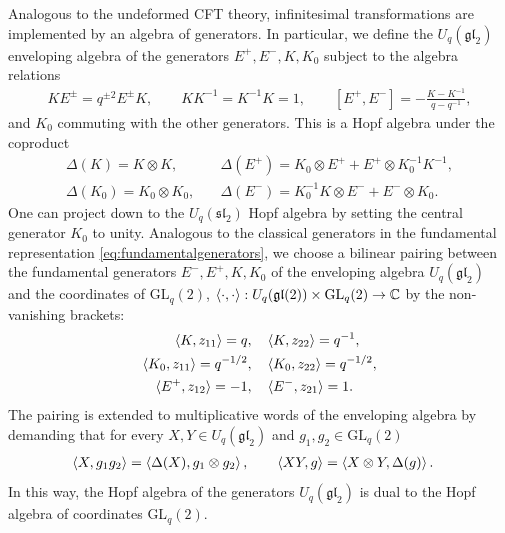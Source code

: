 \documentclass[a4paper,titlepage,12pt]{article}
\numberwithin{equation}{section}
\begin{document}
Analogous to the undeformed CFT theory, infinitesimal transformations are implemented by an algebra of generators. In particular, we define the $U_q(\mathfrak{gl}_2)$ enveloping algebra of the generators $E^+,E^-,K,K_0$ subject to the algebra relations \begin{align}\label{eq:generatoralgebra}
    KE^\pm=q^{\pm 2}E^\pm K, \qquad KK^{-1}=K^{-1}K=1, \qquad [E^+,E^-]=-\frac{K-K^{-1}}{q-q^{-1}},
\end{align} and $K_0$ commuting with the other generators. This is a Hopf algebra under the coproduct 
\begin{align}
    \Delta(K) = K \otimes K, &\quad \Delta(E^+) = K_0 \otimes E^+ + E^+ \otimes K_0^{-1}K^{-1}, \\
    \Delta(K_0)= K_0 \otimes K_0,& \quad \Delta(E^-) =  K_0^{-1}K \otimes E^- + E^- \otimes K_0.
\end{align}  
One can project down to the $U_q(\mathfrak{sl}_2)$ Hopf algebra by setting the central generator $K_0$ to unity.
 Analogous to the classical generators in the fundamental representation \eqref{eq:fundamentalgenerators}, we choose a bilinear pairing between the fundamental generators $E^-,E^+,K,K_0$ of the enveloping algebra $U_q(\mathfrak{gl}_2)$ and the coordinates of GL$_q(2)$, $\braket{\cdot,\cdot}: U_q(\mathfrak{gl}(2)) \times \text{GL}_q(2) \to \mathbb{C}$ by the non-vanishing brackets:
\begin{align}
\label{eq:pairings}
    \braket{K,z_{11}} = q, &\quad \braket{K,z_{22}} = q^{-1},\\
    \braket{K_0,z_{11}} = q^{-1/2}, &\quad \braket{K_0,z_{22}} = q^{-1/2},\\
    \braket{E^+,z_{12}} = -1, &\quad \braket{E^-,z_{21}} = 1.  
\end{align} 
The pairing is extended to multiplicative words of the enveloping algebra by demanding that for every $X,Y\in U_q(\mathfrak{gl}_2)$ and $g_1,g_2\in \text{GL}_q(2)$ 
\begin{align}
    \braket{X,g_1 g_2} &= \braket{\Delta(X),g_1 \otimes g_2}, \qquad
    \braket{XY,g} = \braket{X \otimes Y, \Delta(g)}.
    \label{eq:hopfduality}
\end{align}
In this way, the Hopf algebra of the generators $U_q(\mathfrak{gl}_2)$ is dual to the Hopf algebra of coordinates GL$_q(2)$. 
\end{document}
